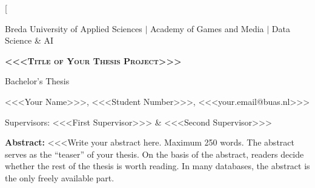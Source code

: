 \documentclass[12pt,a4paper,twocolumn]{article}
\begin{document}
\twocolumn[
  \begin{@twocolumnfalse}

  \begin{center}
    {\small\color{guidegray}
      Breda University of Applied Sciences \hspace{1em}$\mid$\hspace{1em}
      Academy of Games and Media \hspace{1em}$\mid$\hspace{1em}
      Data Science \& AI}
    \vspace{12pt}

    {\fontsize{16}{19}\bfseries\scshape
      <<<Title of Your Thesis Project>>>
    \par}
    \vspace{3pt}

    {\normalsize Bachelor's Thesis}
    \vspace{6pt}

    {\normalsize
      <<<Your Name>>>, <<<Student Number>>>, <<<your.email@buas.nl>>>}
    \vspace{2pt}

    {\normalsize
      Supervisors: <<<First Supervisor>>> \& <<<Second Supervisor>>>}
    \vspace{12pt}

    \begin{minipage}{0.92\textwidth}
      \small
      \setlength{\parindent}{6mm}

      \textbf{Abstract:}
      <<<Write your abstract here. Maximum 250 words. The abstract serves as
      the ``teaser'' of your thesis. On the basis of the abstract, readers
      decide whether the rest of the thesis is worth reading. In many
      databases, the abstract is the only freely available part.


\end{minipage}
\end{center}
\end{@twocolumnfalse}
\end{document}
